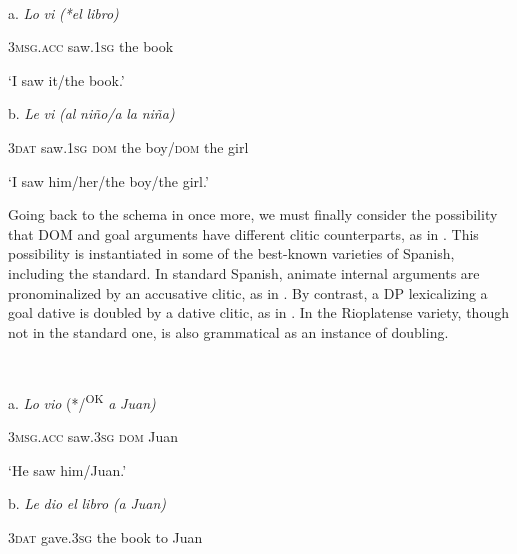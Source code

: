 \documentclass[output=paper]{langscibook}
\begin{document}
\ea\label{ex:key:}
{}\\
\z

a.   \textit{Lo}     \textit{vi}     \textit{(*el} \textit{libro)}



\textsc{3msg.acc}  saw.\textsc{1sg}  the book


‘I saw it/the book.’


   b.   \textit{Le}   \textit{vi}     \textit{(al} \textit{niño/a} \textit{la} \textit{niña)}



\textsc{3dat}  saw.\textsc{1sg}  \textsc{dom} the boy/\textsc{dom} the girl


‘I saw him/her/the boy/the girl.’

Going back to the schema in  once more, we must finally consider the possibility that DOM and goal arguments have different clitic counterparts, as in . This possibility is instantiated in some of the best-known varieties of Spanish, including the standard. In standard Spanish, animate internal arguments are pronominalized by an accusative clitic, as in . By contrast, a DP lexicalizing a goal dative is doubled by a dative clitic, as in . In the Rioplatense variety, though not in the standard one,  is also grammatical as an instance of doubling.

\ea\label{ex:key:}
{}\\
\z

a.  \textit{Lo}     \textit{vio}    (*/\textsuperscript{OK}\textit{\textsuperscript{} }\textit{a} \textit{Juan)} 



  \textsc{3msg.acc}  saw.\textsc{3sg}  \textsc{dom} Juan


  ‘He saw him/Juan.’


  b.  \textit{Le}   \textit{dio}     \textit{el} \textit{libro}   \textit{(a} \textit{Juan)}



  \textsc{3dat}   gave.\textsc{3sg}  the book   to Juan
\end{document}
